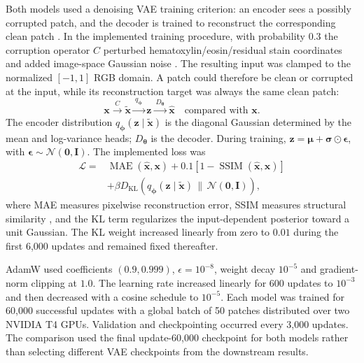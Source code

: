 \documentclass[conference,a4paper]{IEEEtran}
\begin{document}
Both models used a denoising VAE training criterion: an encoder sees a
possibly corrupted patch, and the decoder is trained to reconstruct the
corresponding clean patch \cite{im_denoising_2017}. In the implemented training procedure,
with probability $0.3$ the corruption operator $C$ perturbed
hematoxylin/eosin/residual stain coordinates and added image-space Gaussian
noise
\cite{ruifrok_color_2001}. The resulting input was clamped to the
normalized $[-1,1]$ RGB domain. A patch could therefore be clean or
corrupted at the input, while its reconstruction target was always the same
clean patch:
\begin{equation}
\mathbf{x}\xrightarrow{\ C\ }\widetilde{\mathbf{x}}
\xrightarrow{\ q_{\boldsymbol{\phi}}\ }\mathbf{z}
\xrightarrow{\ D_{\boldsymbol{\theta}}\ }\widehat{\mathbf{x}}
\quad\text{compared with }\mathbf{x}.
\label{eq:denoise-path}
\end{equation}
The encoder distribution
$q_{\boldsymbol{\phi}}(\mathbf{z}\mid\widetilde{\mathbf{x}})$ is the
diagonal Gaussian determined by the mean and log-variance heads;
$D_{\boldsymbol{\theta}}$ is the decoder. During training,
$\mathbf{z}=\boldsymbol{\mu}+\boldsymbol{\sigma}\odot\boldsymbol{\epsilon}$,
with $\boldsymbol{\epsilon}\sim\mathcal{N}(\mathbf{0},\mathbf{I})$.
The implemented loss was
\begin{equation}
\begin{aligned}
\mathcal{L}={}&\operatorname{MAE}(\widehat{\mathbf{x}},\mathbf{x})
+0.1[1-\operatorname{SSIM}(\widehat{\mathbf{x}},\mathbf{x})]\\
&+\beta D_{\mathrm{KL}}\!\left(
q_{\boldsymbol{\phi}}(\mathbf{z}\mid\widetilde{\mathbf{x}})
\,\|\,\mathcal{N}(\mathbf{0},\mathbf{I})\right),
\end{aligned}
\label{eq:vae-loss}
\end{equation}
where MAE measures pixelwise reconstruction error, SSIM measures structural
similarity \cite{wang_image_2004}, and the KL term regularizes the
input-dependent posterior toward a unit Gaussian. The KL weight increased
linearly from zero to $0.01$ during the first 6,000 updates and remained fixed
thereafter.

AdamW \cite{loshchilov_adamw_2019} used coefficients $(0.9,0.999)$,
$\epsilon=10^{-8}$, weight decay $10^{-5}$ and gradient-norm clipping at $1.0$.
The learning rate increased linearly for 600 updates to $10^{-3}$ and then
decreased with a cosine schedule to $10^{-5}$. Each model was trained for
60,000 successful updates with a global batch of 50 patches distributed over
two NVIDIA T4 GPUs. Validation and checkpointing occurred every 3,000 updates.
The comparison used the final update-60,000 checkpoint for both models rather
than selecting different VAE checkpoints from the downstream results.
\end{document}
